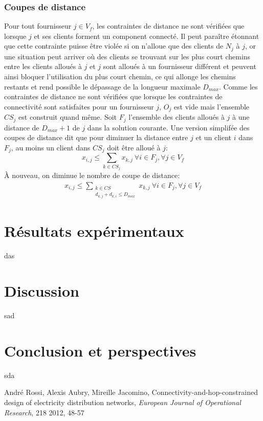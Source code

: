 \documentclass[12pt,a4paper]{article}
\begin{document}
\begin{multicols}{2}
\subsubsection*{Coupes de distance}
Pour tout fournisseur $j \in V_{f}$, les contraintes de distance ne sont vérifiées que lorsque $j$ et ses clients forment un component connecté. Il peut paraître étonnant que cette contrainte puisse être violée si on n'alloue que des clients de $N_{j}$ à $j$, or une situation peut arriver où des clients se trouvant sur les plus court chemins entre les clients alloués à $j$ et $j$ sont alloués à un fournisseur différent et peuvent ainsi bloquer l'utilisation du plus court chemin, ce qui allonge les chemins restants et rend possible le dépassage de la longueur maximale $D_{max}$.\newline \indent
Comme les contraintes de distance ne sont vérifiées que lorsque les contraintes de connectivité sont satisfaites pour un fournisseur $j$, $O_{j}$ est vide mais l'ensemble $CS_{j}$ est construit quand même. Soit $F_{j}$ l'ensemble des clients alloués à $j$ à une distance de $D_{max}+1$ de $j$ dans la solution courante.\newline \indent
Une version simplifée des coupes de distance dit que pour diminuer la distance entre $j$ et un client $i$ dans $F_{j}$, au moins un client dans $CS_{j}$ doit être alloué à $j$:
\begin{equation*}
x_{i,j} \leq \sum_{k \in CS_{j}}{x_{k,j}} \ \forall i \in F_{j}, \forall j \in V_{f}
\end{equation*}
À nouveau, on diminue le nombre de coupe de distance:
\begin{equation}
\begin{aligned}
x_{i,j} \leq \sum_{\substack{k \in CS \\d_{k,j}+d_{k,i}\leq D_{max}}}{x_{k,j}} \ \forall i \in F_{j}, \forall j \in V_{f}
\end{aligned}
\end{equation}
\section{Résultats expérimentaux}
das
\section{Discussion}
sad
\section{Conclusion et perspectives}
sda


\begin{thebibliography}{20}
André Rossi, Alexis Aubry, Mireille Jacomino, Connectivity-and-hop-constrained design of electricity distribution networks,  \textit{European Journal of Operational Research}, 218 2012, 48-57
\end{thebibliography}
\end{multicols}
\end{document}
